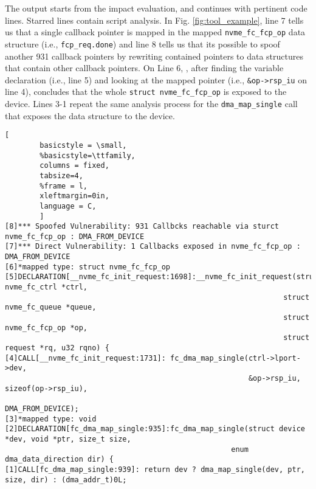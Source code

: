 The output starts from the impact evaluation, and continues with pertinent code lines. Starred lines contain script analysis. In Fig. \ref{fig:tool_example}, line 7 tells us that a single callback pointer is mapped in the mapped \texttt{nvme\_fc\_fcp\_op} data structure (i.e., \texttt{fcp\_req.done}) and line 8 tells us that its possible to spoof another 931 callback pointers by rewriting contained pointers to data structures that contain other callback pointers. On Line 6, \tool, after finding the variable declaration (i.e., line 5) and looking at the mapped pointer (i.e., \texttt{\&op->rsp\_iu} on line 4), concludes that the whole \texttt{struct nvme\_fc\_fcp\_op} is exposed to the device. Lines 3-1 repeat the same analysis process for the \texttt{dma\_map\_single} call that exposes the data structure to the device. 

\begin{figure*}[t]

        \begin{lstlisting}[
        basicstyle = \small,
        %basicstyle=\ttfamily,
        columns = fixed,
        tabsize=4,
        %frame = l,
        xleftmargin=0in,
        language = C,
        ]
[8]*** Spoofed Vulnerability: 931 Callbcks reachable via sturct nvme_fc_fcp_op : DMA_FROM_DEVICE
[7]*** Direct Vulnerability: 1 Callbacks exposed in nvme_fc_fcp_op : DMA_FROM_DEVICE
[6]*mapped type: struct nvme_fc_fcp_op
[5]DECLARATION[__nvme_fc_init_request:1698]:__nvme_fc_init_request(struct nvme_fc_ctrl *ctrl,
                                                                struct nvme_fc_queue *queue, 
                                                                struct nvme_fc_fcp_op *op, 
                                                                struct request *rq, u32 rqno) {
[4]CALL[__nvme_fc_init_request:1731]: fc_dma_map_single(ctrl->lport->dev,
                                                        &op->rsp_iu, sizeof(op->rsp_iu),
                                                        DMA_FROM_DEVICE);
[3]*mapped type: void
[2]DECLARATION[fc_dma_map_single:935]:fc_dma_map_single(struct device *dev, void *ptr, size_t size, 
                                                    enum dma_data_direction dir) {
[1]CALL[fc_dma_map_single:939]: return dev ? dma_map_single(dev, ptr, size, dir) : (dma_addr_t)0L;

                \end{lstlisting}
        \caption{ Tool output example.}
        \label{fig:tool_example}

\end{figure*}
